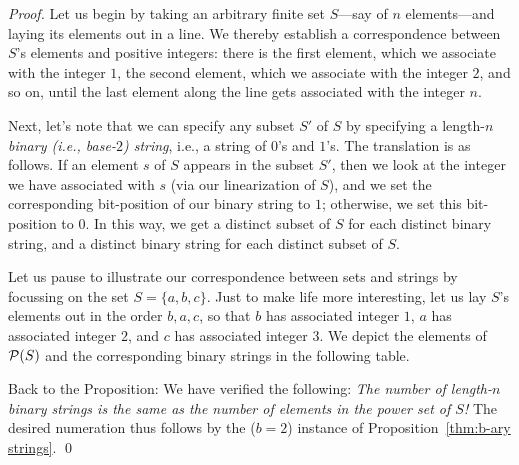 \begin{proof}
Let us begin by taking an arbitrary finite set $S$---say of $n$
elements---and laying its elements out in a line.  We thereby
establish a correspondence between $S$'s elements and positive
integers: there is the first element, which we associate with the
integer $1$, the second element, which we associate with the integer
$2$, and so on, until the last element along the line gets associated
with the integer $n$.

Next, let's note that we can specify any subset $S'$ of $S$ by
specifying a length-$n$ {\em binary (i.e., base-$2$) string}, i.e., a
string of $0$'s and $1$'s.  The translation is as follows.  If an
element $s$ of $S$ appears in the subset $S'$, then we look at the
integer we have associated with $s$ (via our linearization of $S$),
and we set the corresponding bit-position of our binary string to $1$;
otherwise, we set this bit-position to $0$.  In this way, we get a
distinct subset of $S$ for each distinct binary string, and a distinct
binary string for each distinct subset of $S$.

Let us pause to illustrate our correspondence between sets and strings
by focussing on the set $S = \{a,b,c\}$.  Just to make life more
interesting, let us lay $S$'s elements out in the order $b,a,c$, so
that $b$ has associated integer $1$, $a$ has associated integer $2$,
and $c$ has associated integer $3$.  We depict the elements of $\mbox{$\cal P$}(S)$
and the corresponding binary strings in the following table.
\begin{center}
\end{center}

Back to the Proposition: We have verified the following: {\em The
  number of length-$n$ binary strings is the same as the number of
  elements in the power set of $S$!}  The desired numeration thus
follows by the ($b=2$) instance of Proposition~\ref{thm:b-ary
  strings}.  \qed
\end{proof}

